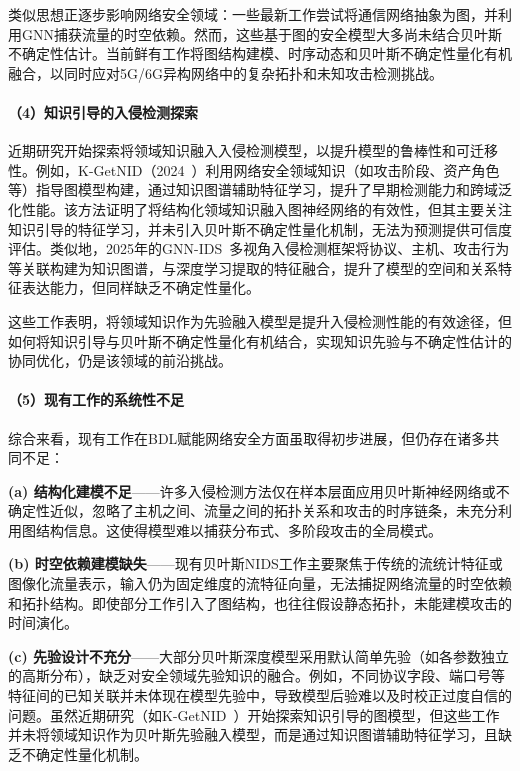 类似思想正逐步影响网络安全领域：一些最新工作尝试将通信网络抽象为图，并利用GNN捕获流量的时空依赖。然而，这些基于图的安全模型大多尚未结合贝叶斯不确定性估计。当前鲜有工作将图结构建模、时序动态和贝叶斯不确定性量化有机融合，以同时应对5G/6G异构网络中的复杂拓扑和未知攻击检测挑战。

\paragraph{（4）知识引导的入侵检测探索}

近期研究开始探索将领域知识融入入侵检测模型，以提升模型的鲁棒性和可迁移性。例如，K-GetNID（2024~\cite{Wang2024KGetNID}）利用网络安全领域知识（如攻击阶段、资产角色等）指导图模型构建，通过知识图谱辅助特征学习，提升了早期检测能力和跨域泛化性能。该方法证明了将结构化领域知识融入图神经网络的有效性，但其主要关注知识引导的特征学习，并未引入贝叶斯不确定性量化机制，无法为预测提供可信度评估。类似地，2025年的GNN-IDS~\cite{sun2024gnnids}多视角入侵检测框架将协议、主机、攻击行为等关联构建为知识图谱，与深度学习提取的特征融合，提升了模型的空间和关系特征表达能力，但同样缺乏不确定性量化。

这些工作表明，将领域知识作为先验融入模型是提升入侵检测性能的有效途径，但如何将知识引导与贝叶斯不确定性量化有机结合，实现知识先验与不确定性估计的协同优化，仍是该领域的前沿挑战。

\paragraph{（5）现有工作的系统性不足}

综合来看，现有工作在BDL赋能网络安全方面虽取得初步进展，但仍存在诸多共同不足：

\textbf{(a) 结构化建模不足}——许多入侵检测方法仅在样本层面应用贝叶斯神经网络或不确定性近似，忽略了主机之间、流量之间的拓扑关系和攻击的时序链条，未充分利用图结构信息。这使得模型难以捕获分布式、多阶段攻击的全局模式。

\textbf{(b) 时空依赖建模缺失}——现有贝叶斯NIDS工作主要聚焦于传统的流统计特征或图像化流量表示，输入仍为固定维度的流特征向量，无法捕捉网络流量的时空依赖和拓扑结构。即使部分工作引入了图结构，也往往假设静态拓扑，未能建模攻击的时间演化。

\textbf{(c) 先验设计不充分}——大部分贝叶斯深度模型采用默认简单先验（如各参数独立的高斯分布），缺乏对安全领域先验知识的融合。例如，不同协议字段、端口号等特征间的已知关联并未体现在模型先验中，导致模型后验难以及时校正过度自信的问题。虽然近期研究（如K-GetNID~\cite{Wang2024KGetNID}）开始探索知识引导的图模型，但这些工作并未将领域知识作为贝叶斯先验融入模型，而是通过知识图谱辅助特征学习，且缺乏不确定性量化机制。

